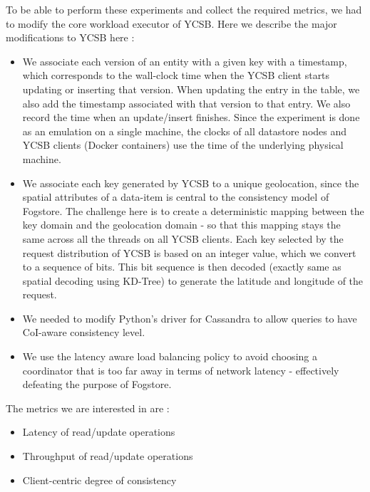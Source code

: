 \par To be able to perform these experiments and collect the required metrics, we had to modify the core workload executor of YCSB. Here we describe the major modifications to YCSB here :
\begin{itemize}
\item We associate each version of an entity with a given key with a timestamp, which corresponds to the wall-clock time when the YCSB client starts updating or inserting that version. When updating the entry in the table, we also add the timestamp associated with that version to that entry. We also record the time when an update/insert finishes. Since the experiment is done as an emulation on a single machine, the clocks of all datastore nodes and YCSB clients (Docker containers) use the time of the underlying physical machine.
\item We associate each key generated by YCSB to a unique geolocation, since the spatial attributes of a data-item is central to the consistency model of Fogstore. The challenge here is to create a deterministic mapping between the key domain and the geolocation domain - so that this mapping stays the same across all the threads on all YCSB clients. Each key selected by the request distribution of YCSB is based on an integer value, which we convert to a sequence of bits. This bit sequence is then decoded (exactly same as spatial decoding using KD-Tree) to generate the latitude and longitude of the request.
\item We needed to modify Python's driver for Cassandra to allow queries to have CoI-aware consistency level.
\item We use the latency aware load balancing policy to avoid choosing a coordinator that is too far away in terms of network latency - effectively defeating the purpose of Fogstore.
\end{itemize}

\par The metrics we are interested in are :
\begin{itemize}
\item Latency of read/update operations
\item Throughput of read/update operations
\item Client-centric degree of consistency
\end{itemize}

